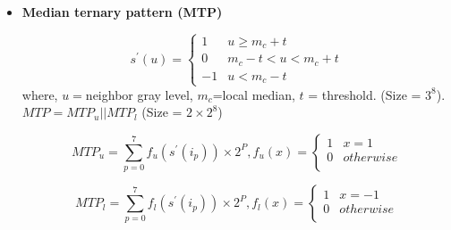 \begin{frame}[t]{\subsubsecname}
	\topline
    \begin{itemize}
    	\item \textcolor{navy_theme}{\textbf{ Median ternary pattern (MTP) \cite{bashar2014robust} }}
			
			\begin{equation}
				s^{\prime}(u)=\left\{\begin{matrix}
					1  & u \geq m_{c}+t       \\
					0  & m_{c}-t < u <m_{c}+t \\
					-1 & u < m_{c}-t
				\end{matrix}\right.
			\end{equation}
			where, $u=$neighbor gray level, $m_{c}$=local median, $t$ = threshold. (Size = $3^{8}$). 
			\\$MTP = MTP_{u} || MTP_{l}$ (Size =  $2 \times 2 ^{8}$)
						
			\begin{equation}
				MTP_{u}=\sum_{p=0}^{7}f_{u}(s^{\prime}(i_{p})) \times 2^{P},
				f_{u}(x)=\left\{\begin{matrix}
					1 & x =1      \\
					0 & otherwise \\
				\end{matrix}\right.
			\end{equation}


			\begin{equation}
				MTP_{l}=\sum_{p=0}^{7}f_{l}(s^{\prime}(i_{p})) \times 2^{P},
				f_{l}(x)=\left\{\begin{matrix}
					1 & x=-1      \\
					0 & otherwise \\
				\end{matrix}\right.
			\end{equation}
			
	\end{itemize}
\end{frame}

